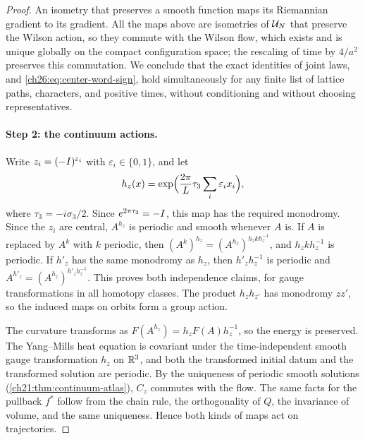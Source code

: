\begin{proof}
An isometry that preserves a smooth function maps its Riemannian gradient to its gradient. All the maps above are isometries of $\mathcal U_{N}$ that preserve the Wilson action, so they commute with the Wilson flow, which exists and is unique globally on the compact configuration space; the rescaling of time by $4/a^2$ preserves this commutation. We conclude that the exact identities of joint laws, and \eqref{ch26:eq:center-word-sign}, hold simultaneously for any finite list of lattice paths, characters, and positive times, without conditioning and without choosing representatives.

\paragraph{Step 2: the continuum actions.}
Write $z_i=(-I)^{\varepsilon_i}$ with $\varepsilon_i\in\{0,1\}$, and let
\[
 h_z(x)=\exp\Bigl(\frac{2\pi}{L}\tau_3\sum_i\varepsilon_ix_i\Bigr),
\]
where $\tau_3=-i\sigma_3/2$. Since $e^{2\pi\tau_3}=-I$, this map has the required monodromy. Since the $z_i$ are central, $A^{h_z}$ is periodic and smooth whenever $A$ is. If $A$ is replaced by $A^k$ with $k$ periodic, then $(A^k)^{h_z}=(A^{h_z})^{h_zkh_z^{-1}}$, and $h_zkh_z^{-1}$ is periodic. If $h'_z$ has the same monodromy as $h_z$, then $h'_zh_z^{-1}$ is periodic and $A^{h'_z}=(A^{h_z})^{h'_zh_z^{-1}}$. This proves both independence claims, for gauge transformations in all homotopy classes. The product $h_zh_{z'}$ has monodromy $zz'$, so the induced maps on orbits form a group action.

The curvature transforms as $F(A^{h_z})=h_zF(A)h_z^{-1}$, so the energy is preserved. The Yang--Mills heat equation is covariant under the time-independent smooth gauge transformation $h_z$ on $\mathbb R^3$, and both the transformed initial datum and the transformed solution are periodic. By the uniqueness of periodic smooth solutions (\cref{ch21:thm:continuum-atlas}), $C_z$ commutes with the flow. The same facts for the pullback $f^*$ follow from the chain rule, the orthogonality of $Q$, the invariance of volume, and the same uniqueness. Hence both kinds of maps act on trajectories.


\end{proof}
